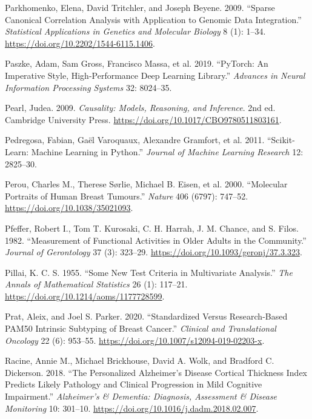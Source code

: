 \documentclass[
  10pt,
  letterpaper,
]{report}
\newlength{\cslhangindent}
\newenvironment{CSLReferences}[2] %
 {\begin{list}{}{%
  \setlength{\itemindent}{0pt}
  \setlength{\leftmargin}{0pt}
  \setlength{\parsep}{0pt}
  \ifodd #1
   \setlength{\leftmargin}{\cslhangindent}
   \setlength{\itemindent}{-1\cslhangindent}
  \fi
  \setlength{\itemsep}{#2\baselineskip}}}
 {\end{list}}
\begin{document}
\begin{CSLReferences}{1}{1}
Parkhomenko, Elena, David Tritchler, and Joseph Beyene. 2009. {``Sparse
Canonical Correlation Analysis with Application to Genomic Data
Integration.''} \emph{Statistical Applications in Genetics and Molecular
Biology} 8 (1): 1--34. \url{https://doi.org/10.2202/1544-6115.1406}.

{Paszke, Adam, Sam Gross, Francisco Massa, et al.} 2019. {``{PyTorch}:
An Imperative Style, High-Performance Deep Learning Library.''}
\emph{Advances in Neural Information Processing Systems} 32: 8024--35.

Pearl, Judea. 2009. \emph{Causality: Models, Reasoning, and Inference}.
2nd ed. Cambridge University Press.
\url{https://doi.org/10.1017/CBO9780511803161}.

{Pedregosa, Fabian, Gaël Varoquaux, Alexandre Gramfort, et al.} 2011.
{``Scikit-Learn: Machine Learning in {Python}.''} \emph{Journal of
Machine Learning Research} 12: 2825--30.

{Perou, Charles M., Therese Sørlie, Michael B. Eisen, et al.} 2000.
{``Molecular Portraits of Human Breast Tumours.''} \emph{Nature} 406
(6797): 747--52. \url{https://doi.org/10.1038/35021093}.

Pfeffer, Robert I., Tom T. Kurosaki, C. H. Harrah, J. M. Chance, and S.
Filos. 1982. {``Measurement of Functional Activities in Older Adults in
the Community.''} \emph{Journal of Gerontology} 37 (3): 323--29.
\url{https://doi.org/10.1093/geronj/37.3.323}.

Pillai, K. C. S. 1955. {``Some New Test Criteria in Multivariate
Analysis.''} \emph{The Annals of Mathematical Statistics} 26 (1):
117--21. \url{https://doi.org/10.1214/aoms/1177728599}.

Prat, Aleix, and Joel S. Parker. 2020. {``Standardized Versus
Research-Based {PAM50} Intrinsic Subtyping of Breast Cancer.''}
\emph{Clinical and Translational Oncology} 22 (6): 953--55.
\url{https://doi.org/10.1007/s12094-019-02203-x}.

Racine, Annie M., Michael Brickhouse, David A. Wolk, and Bradford C.
Dickerson. 2018. {``The Personalized {Alzheimer's} Disease Cortical
Thickness Index Predicts Likely Pathology and Clinical Progression in
Mild Cognitive Impairment.''} \emph{Alzheimer's \& Dementia: Diagnosis,
Assessment \& Disease Monitoring} 10: 301--10.
\url{https://doi.org/10.1016/j.dadm.2018.02.007}.


\end{CSLReferences}
\end{document}
